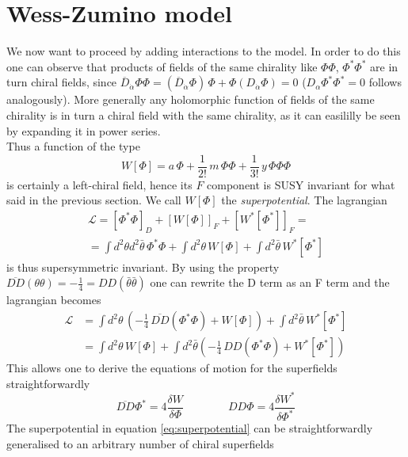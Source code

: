 \documentclass[12pt]{article}
\begin{document}
\section{Wess-Zumino model}

We now want to proceed by adding interactions to the model. In order to do this one can observe that products of fields of the same chirality like $\Phi\Phi$, $\Phi^*\Phi^*$ are in turn chiral fields, since 
$\overline{D}_{\dot\alpha} \Phi\Phi = (\overline{D}_{\dot\alpha} \Phi) \, \Phi + \Phi (D_{\dot\alpha} \Phi) = 0$ ($D_\alpha \Phi^*\Phi^*=0$ follows analogously). More generally any holomorphic function of fields of the same chirality is in turn a chiral field with the same chirality, as it can easililly be seen by expanding it in power series. \\
Thus a function of the type
\begin{equation}
  W[\Phi] = a \, \Phi + \frac{1}{2!} \, m \, \Phi\Phi + \frac{1}{3!} \, y  \, \Phi \Phi \Phi
  \label{eq:superpotential}
\end{equation}
is certainly a left-chiral field, hence its $F$ component is SUSY invariant for what said in the previous section. We call $W[\Phi]$ the \emph{superpotential}. The lagrangian
\begin{gather*}
  \mathcal{L} = \left[\Phi^*\Phi\right]_D + \left[W[\Phi]\right]_F + \left[W^*[\Phi^*]\right]_F = \\
  = \int d^2\theta d^2\bar\theta \, \Phi^*\Phi + \int d^2\theta \, W[\Phi] + \int d^2 \bar\theta \, W^*[\Phi^*] 
\end{gather*}
is thus supersymmetric invariant. By using the property $\overline{DD}(\theta\theta) = -\frac{1}{4} = DD(\bar\theta\bar\theta)$ one can rewrite the D term as an F term and the lagrangian becomes
\begin{align*}
  \mathcal{L} &= \int d^2\theta \, \left(-\frac{1}{4} \, \overline{DD}(\Phi^*\Phi) + W[\Phi]\right) + \int d^2\bar\theta \, W^*[\Phi^*] \\
  &= \int d^2\theta \, W[\Phi] + \int d^2\bar\theta \left(-\frac{1}{4} \, DD(\Phi^*\Phi) + W^*[\Phi^*]\right)
\end{align*}
This allows one to derive the equations of motion for the superfields straightforwardly
\begin{equation*}
  \overline{DD} \Phi^* = 4\frac{\delta W}{\delta \Phi} \qquad\qquad  DD\Phi = 4\frac{\delta W^*}{\delta \Phi^*}
\end{equation*}
The superpotential in equation \ref{eq:superpotential} can be straightforwardly generalised to an arbitrary number of chiral superfields \
\end{document}
